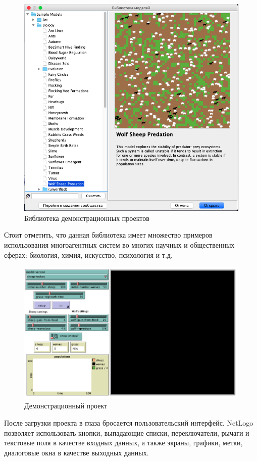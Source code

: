 \documentclass[14pt,a4paper,report]{report}
\begin{document}
\begin{figure}[h!]
	\centering
	\includegraphics[scale = 0.60]{images/2.png}
	\caption{Библиотека демонстрационных проектов}
\end{figure}
\clearpage
Стоит отметить, что данная библиотека имеет множество примеров использования многоагентных систем во многих научных и общественных сферах: биология, химия, искусство, психология и т.д.

\begin{figure}[h!]
	\centering
	\includegraphics[scale = 0.60]{images/3.png}
	\caption{Демонстрационный проект}
\end{figure}
\clearpage
После загрузки проекта в глаза бросается пользовательский интерфейс. NetLogo позволяет использовать кнопки, выпадающие списки, переключатели, рычаги и текстовые поля в качестве входных данных, а также экраны, графики, метки, диалоговые окна в качестве выходных данных.
\end{document}
